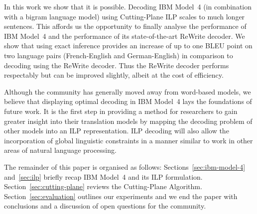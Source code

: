 In this work we show that it is possible.  Decoding IBM Model~4 (in
combination with a bigram language model) using Cutting-Plane ILP
scales to much longer sentences.  This affords us the opportunity to
finally analyse the performance of IBM Model~4 and the performance of
its state-of-the-art ReWrite decoder.  We show that using exact
inference provides an increase of up to one BLEU point on two language
pairs (French-English and German-English) in comparison to decoding
using the ReWrite decoder.  Thus the ReWrite decoder performs
respectably but can be improved slightly, albeit at the cost of
efficiency.

Although the community has generally moved away from word-based
models, we believe that displaying optimal decoding in IBM Model~4
lays the foundations of future work.  It is the first step in
providing a method for researchers to gain greater insight into their
translation models by mapping the decoding problem of other models
into an ILP representation.  ILP decoding will also allow the
incorporation of global linguistic constraints in a manner similar to
work in other areas of natural language processing.

The remainder of this paper is organised as follows:
Sections~\ref{sec:ibm-model-4} and~\ref{sec:ilp} briefly recap IBM
Model~4 and its ILP formulation.  Section~\ref{sec:cutting-plane}
reviews the Cutting-Plane Algorithm.  Section~\ref{sec:evaluation}
outlines our experiments and we end the paper with conclusions and a
discussion of open questions for the community.


